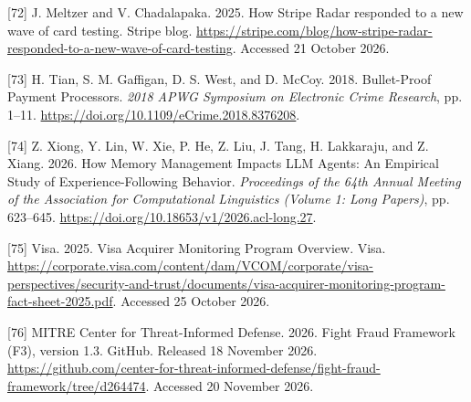 \documentclass[acmlarge,nonacm]{acmart}
\newlength{\cslhangindent}
\newlength{\cslentryspacingunit} %
\newenvironment{CSLReferences}[2] %
 {\bibliofont %
  \setlength{\parindent}{0pt}
  \ifodd #1
  \let\oldpar\par
  \def\par{\hangindent=\cslhangindent\oldpar}
  \fi
  \setlength{\parskip}{#2\cslentryspacingunit}
 }%
 {}
\begin{document}
\begin{CSLReferences}{1}{1}
\leavevmode{}%
{[}72{]} J. Meltzer and V. Chadalapaka. 2025. How Stripe Radar responded
to a new wave of card testing. Stripe blog.
\url{https://stripe.com/blog/how-stripe-radar-responded-to-a-new-wave-of-card-testing}.
Accessed 21 October 2026.

\leavevmode{}%
{[}73{]} H. Tian, S. M. Gaffigan, D. S. West, and D. McCoy. 2018.
Bullet-Proof Payment Processors. \emph{2018 APWG Symposium on Electronic
Crime Research}, pp. 1--11.
\url{https://doi.org/10.1109/eCrime.2018.8376208}.

\leavevmode{}%
{[}74{]} Z. Xiong, Y. Lin, W. Xie, P. He, Z. Liu, J. Tang, H. Lakkaraju,
and Z. Xiang. 2026. How Memory Management Impacts LLM Agents: An
Empirical Study of Experience-Following Behavior. \emph{Proceedings of
the 64th Annual Meeting of the Association for Computational Linguistics
(Volume 1: Long Papers)}, pp. 623--645.
\url{https://doi.org/10.18653/v1/2026.acl-long.27}.

\leavevmode{}%
{[}75{]} Visa. 2025. Visa Acquirer Monitoring Program Overview. Visa.
\url{https://corporate.visa.com/content/dam/VCOM/corporate/visa-perspectives/security-and-trust/documents/visa-acquirer-monitoring-program-fact-sheet-2025.pdf}.
Accessed 25 October 2026.

\leavevmode{}%
{[}76{]} MITRE Center for Threat-Informed Defense. 2026. Fight Fraud
Framework (F3), version 1.3. GitHub. Released 18 November 2026.
\url{https://github.com/center-for-threat-informed-defense/fight-fraud-framework/tree/d264474}.
Accessed 20 November 2026.

\end{CSLReferences}
\end{document}
